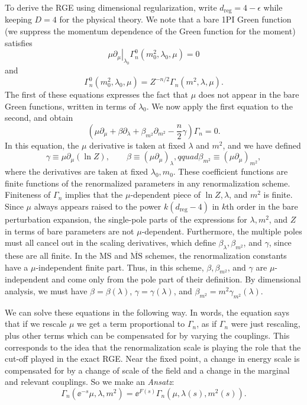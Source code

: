 To derive the RGE using dimensional regularization, write
$d_{\mathrm{reg}}=4-\epsilon$ while keeping $D=4$ for the physical theory.
We note that a bare 1PI
Green function (we suppress the momentum dependence of the Green function for
the moment) satisfies
\[
  \left.\mu\partial_\mu\right|_{\lambda_0}\Gamma_n^0(m_0^2,\lambda_0,\mu)=0
\]
and
\[
  \Gamma_n^0(m_0^2,\lambda_0,\mu)=Z^{-n/2}\Gamma_n(m^2,\lambda,\mu).
\]
The first of these equations expresses the fact that $\mu$ does not appear in
the bare Green functions, written in terms of $\lambda_0$. We now apply the first
equation to the second, and obtain
\[
  \left(\mu\partial_\mu+\beta\partial_\lambda
  +\beta_{m^2}\partial_{m^2}-\frac{n}{2}\gamma\right)\Gamma_n=0.
\]
In this equation, the $\mu$ derivative is taken at fixed $\lambda$ and $m^2$,
and we have defined
\[
  \gamma\equiv\mu\partial_\mu(\ln Z),\qquad
  \beta\equiv(\mu\partial_\mu)_\lambda,qquad
  \beta_{m^2}\equiv(\mu\partial_\mu)_{m^2},
\]
where the derivatives are taken at fixed $\lambda_0,m_0$. These coefficient
functions are finite functions of the renormalized parameters in any
renormalization scheme. Finiteness of $\Gamma_n$ implies that the $\mu$-dependent
piece of $\ln Z,\lambda$, and $m^2$ is finite. Since $\mu$ always appears raised
to the power $k(d_{\mathrm{reg}}-4)$ in $k$th order in the bare perturbation expansion, the
single-pole parts of the expressions for $\lambda,m^2$, and $Z$ in terms of bare
parameters are not $\mu$-dependent. Furthermore, the multiple poles must all
cancel out in the scaling derivatives, which define $\beta_\lambda,\beta_{m^2}$,
and $\gamma$, since these are all finite. In the MS and $\overline{\mathrm{MS}}$
schemes, the renormalization constants have a $\mu$-independent finite part.
Thus, in this scheme, $\beta,\beta_{m^2}$, and $\gamma$ are $\mu$-independent
and come only from the pole part of their definition. By dimensional analysis,
we must have $\beta=\beta(\lambda)$, $\gamma=\gamma(\lambda)$, and
$\beta_{m^2}=m^2\gamma_{m^2}(\lambda)$.

We can solve these equations in the following way. In words, the equation says
that if we rescale $\mu$ we get a term proportional to $\Gamma_n$, as if
$\Gamma_n$ were just rescaling, plus other terms which can be compensated for by
varying the couplings. This corresponds to the idea that the renormalization
scale is playing the role that the cut-off played in the exact RGE. Near the fixed
point, a change in energy scale is compensated for by a change of scale of the
field and a change in the marginal and relevant couplings. So we make an
\emph{Ansatz}:
\[
  \Gamma_n(\ee^{-s}\mu,\lambda,m^2)
  =\ee^{F(s)}\Gamma_n(\mu,\lambda(s),m^2(s)).
\]

